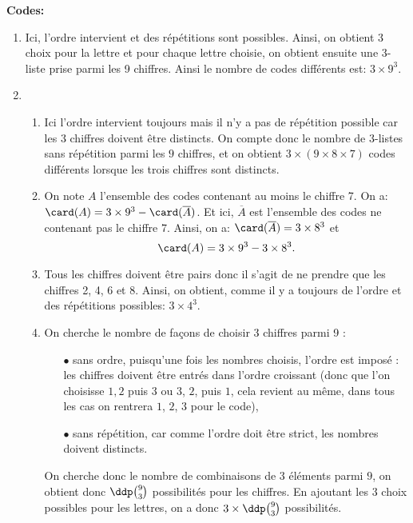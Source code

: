 \documentclass[a4paper, 11pt]{article}
\begin{document}
\begin{correction}  \; \textbf{Codes:}
	\begin{enumerate}
		\item Ici, l'ordre intervient et des r\'ep\'etitions sont possibles. Ainsi, on obtient 3 choix pour la lettre et pour chaque lettre choisie, on
		      obtient ensuite une 3-liste prise parmi les 9 chiffres. Ainsi le nombre de codes diff\'erents est: $3\times 9^3$.
		\item
		      \begin{enumerate}
			      \item Ici l'ordre intervient toujours mais il n'y a pas de r\'ep\'etition possible car les 3 chiffres doivent \^etre distincts. On compte donc le nombre de $3$-listes sans r\'ep\'etition parmi les $9$ chiffres, et on obtient $3\times (9\times 8\times 7)$ codes diff\'erents lorsque les trois chiffres sont distincts.
			      \item On note $A$ l'ensemble des codes contenant au moins le chiffre 7. On a: $\card(A)=3\times 9^3-\card(\overline{A})$. Et ici, $\overline{A}$ est l'ensemble des codes ne contenant pas le chiffre 7. Ainsi, on a: $\card(\overline{A})=3\times 8^3$ et
			            $$\card(A)=3\times 9^3-3\times 8^3.$$
			      \item Tous les chiffres doivent \^etre pairs donc il s'agit de ne prendre que les chiffres 2, 4, 6 et 8. Ainsi, on obtient, comme il y a toujours de l'ordre et des r\'ep\'etitions possibles: $3\times 4^3$.
			      \item  \;
			            On cherche le nombre de fa\c cons de choisir 3 chiffres parmi 9 :
			            \begin{itemize}
				            \item[$\bullet$] sans ordre, puisqu'une fois les nombres choisis, l'ordre est impos\'e : les chiffres doivent \^etre entr\'es dans l'ordre croissant (donc que l'on choisisse $1,2$ puis $3$ ou $3$, $2$, puis $1$, cela revient au m\^eme, dans tous les cas on rentrera $1$, $2$, $3$ pour le code),
				            \item[$\bullet$] sans r\'ep\'etition, car comme l'ordre doit \^etre strict, les nombres doivent distincts.
			            \end{itemize}
			            On cherche donc le nombre de combinaisons de $3$ \'el\'ements parmi $9$, on obtient donc $\ddp \binom{9}{3}$ possibilit\'es pour les chiffres. En ajoutant les $3$ choix possibles pour les lettres, on a donc $3\times \ddp \binom{9}{3}$ possibilit\'es.
		      \end{enumerate}
	\end{enumerate}
\end{correction}
\end{document}
